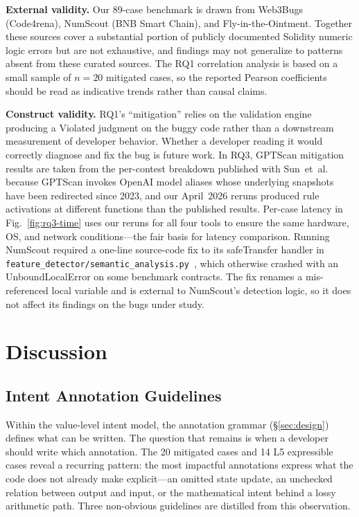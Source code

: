 \documentclass[pdflatex,sn-basic]{sn-jnl}%
\theoremstyle{thmstyleone}%
\theoremstyle{thmstyletwo}%
\theoremstyle{thmstylethree}%
\begin{document}
\smallskip
\noindent\textbf{External validity.}
Our 89-case benchmark is drawn from Web3Bugs (Code4rena), NumScout (BNB Smart Chain), and Fly-in-the-Ointment. Together these sources cover a substantial portion of publicly documented Solidity numeric logic errors but are not exhaustive, and findings may not generalize to patterns absent from these curated sources.
The RQ1 correlation analysis is based on a small sample of $n=20$ mitigated cases, so the reported Pearson coefficients should be read as indicative trends rather than causal claims.

\smallskip
\noindent\textbf{Construct validity.}
RQ1's ``mitigation'' relies on the validation engine producing a Violated judgment on the buggy code rather than a downstream measurement of developer behavior. Whether a developer reading it would correctly diagnose and fix the bug is future work.
In RQ3, GPTScan mitigation results are taken from the per-contest breakdown published with Sun~et~al.~\citep{gptscan,gptscan_web3bugs} because GPTScan invokes OpenAI model aliases whose underlying snapshots have been redirected since 2023, and our April~2026 reruns produced rule activations at different functions than the published results. Per-case latency in Fig.~\ref{fig:rq3-time} uses our reruns for all four tools to ensure the same hardware, OS, and network conditions---the fair basis for latency comparison.
Running NumScout required a one-line source-code fix to its safeTransfer handler in \texttt{feature\_detector/semantic\_analysis.py}~\citep{numscout_semantic}, which otherwise crashed with an UnboundLocalError on some benchmark contracts. The fix renames a mis-referenced local variable and is external to NumScout's detection logic, so it does not affect its findings on the bugs under study.

\section{Discussion}\label{sec:discussion}

\subsection{Intent Annotation Guidelines}\label{sec:disc:guidelines}

Within the value-level intent model, the annotation grammar (§\ref{sec:design}) defines what can be written. The question that remains is when a developer should write which annotation.
The 20 mitigated cases and 14 L5 expressible cases reveal a recurring pattern: the most impactful annotations express what the code does not already make explicit---an omitted state update, an unchecked relation between output and input, or the mathematical intent behind a lossy arithmetic path.
Three non-obvious guidelines are distilled from this observation.
\end{document}
